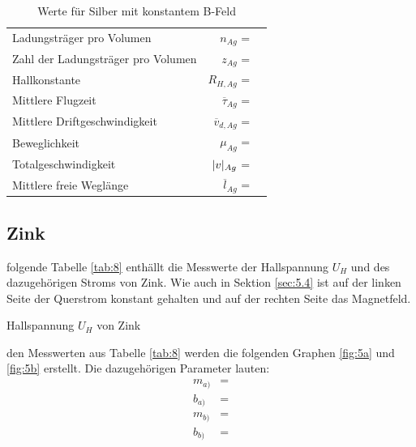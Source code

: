 \begin{table}[H]
\centering
    \begin{tabular}{l r l}
    \toprule
        Ladungsträger pro Volumen               &$n_{Ag}$               = & \text{}  \\
        Zahl der Ladungsträger pro Volumen      &$z_{Ag}$               = & \text{}  \\
        Hallkonstante                           &$R_{H,Ag}$             = & \text{} \\
        Mittlere Flugzeit                       &$\overline{\tau}_{Ag}$ = & \text{}\\
        Mittlere Driftgeschwindigkeit           &$\overline{v}_{d,Ag}$  = & \text{}\\
        Beweglichkeit                           &$\mu_{Ag}$             = & \text{} \\
        Totalgeschwindigkeit                    &$\lvert v\rvert_{Ag}$         = & \text{}  \\
        Mittlere freie Weglänge                 &$\overline{l}_{Ag}$    = & \text{}  \\
        \bottomrule
    \end{tabular}
\caption{Werte für Silber mit konstantem B-Feld}
\label{tab:7}
\end{table}

\subsection{Zink} \label{sec:5.5}

\justifying folgende Tabelle \ref{tab:8} enthällt die Messwerte der Hallspannung $U_H$ und des dazugehörigen Stroms von Zink.
Wie auch in Sektion \ref{sec:5.4} ist auf der linken Seite der Querstrom konstant gehalten und auf der rechten Seite das Magnetfeld.

\begin{table}[H]
    \centering
    
    \caption{Hallspannung $U_H$ von Zink}
    \label{tab:8}
\end{table}

\justifying den Messwerten aus Tabelle \ref{tab:8} werden die folgenden Graphen \ref{fig:5a} und \ref{fig:5b} erstellt. 
Die dazugehörigen Parameter lauten:
\begin{subequations} \label{eq:29}
\begin{align}
    m_{a)} &= \text{} \label{eq:29a}\\
    b_{a)} &= \text{} \label{eq:29b}\\
    m_{b)} &= \text{} \label{eq:29c}\\
    b_{b)} &= \text{} \label{eq:29d}
\end{align}
\end{subequations}

